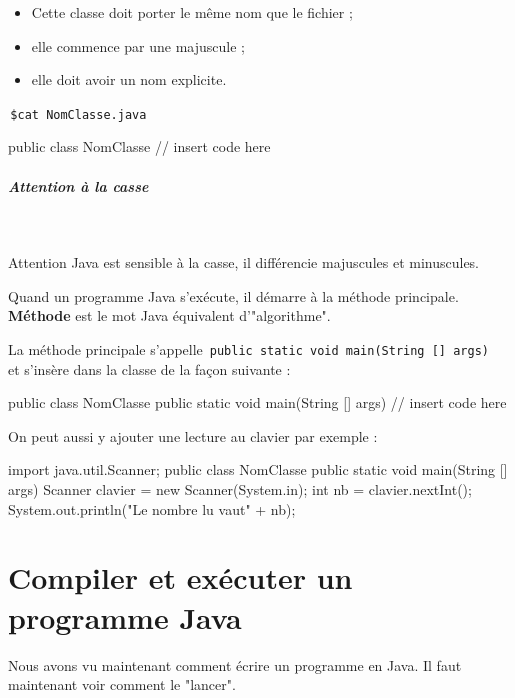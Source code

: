 \documentclass[11pt,a4paper]{article}
\begin{document}
					\begin{itemize}
				
			\item Cette classe doit porter le m\^eme nom que le fichier ;
			\item elle commence par une majuscule ; 
			\item elle doit avoir un nom explicite.
					\end{itemize}
				
            \par
        \,\verb|$cat NomClasse.java|\,
            \par
        \begin{Java}
public class NomClasse {
    // insert code here
}
        \end{Java}
			
		\subparagraph{Attention \`a la casse} 
		
					\textcolor{white}{.} \par
				
            \par
        
          Attention Java est sensible \`a la casse, il diff\'erencie majuscules et minuscules.
        
            \par
        
          Quand un programme Java s'ex\'ecute, il d\'emarre \`a la m\'ethode principale.
          \textbf{M\'ethode} est le mot Java \'equivalent d'"algorithme".
        
            \par
        
          La m\'ethode principale s'appelle \,\verb|public static void main(String [] args) |\, et s'ins\`ere dans la classe de la fa\c con suivante :
        
            \par
        \begin{Java}
public class NomClasse {
    public static void main(String [] args) {
        // insert code here
    }
}
        \end{Java}
          On peut aussi y ajouter une lecture au clavier par exemple :
        
            \par
        \begin{Java}
import java.util.Scanner;
public class NomClasse {
    public static void main(String [] args) {
        Scanner clavier = new Scanner(System.in);
        int nb = clavier.nextInt();
        System.out.println("Le nombre lu vaut" + nb);
    }
}
        \end{Java}\section{Compiler et ex\'ecuter un programme Java}
				Nous avons vu maintenant comment \'ecrire un programme en Java. Il faut maintenant voir comment le "lancer".
      
\end{document}
